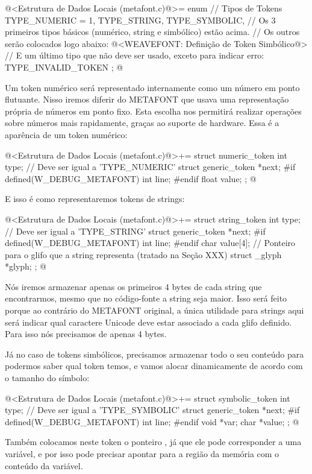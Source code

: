 \iniciocodigo
@<Estrutura de Dados Locais (metafont.c)@>=
enum { // Tipos de Tokens
  TYPE_NUMERIC = 1, TYPE_STRING, TYPE_SYMBOLIC,
  // Os 3 primeiros tipos básicos (numérico, string e simbólico) estão acima.
  // Os outros serão colocados logo abaixo:
  @<WEAVEFONT: Definição de Token Simbólico@>
  // E um último tipo que não deve ser usado, exceto para indicar erro:
  TYPE_INVALID_TOKEN
};
@
\fimcodigo

Um token numérico será representado internamente como um número em
ponto flutuante. Nisso iremos diferir do METAFONT que usava uma
representação própria de números em ponto fixo. Esta escolha nos
permitirá realizar operações sobre números mais rapidamente, graças ao
suporte de hardware.  Essa é a aparência de um token numérico:

\iniciocodigo
@<Estrutura de Dados Locais (metafont.c)@>+=
struct numeric_token{
  int type;   // Deve ser igual a 'TYPE_NUMERIC'
  struct generic_token *next;
#if defined(W_DEBUG_METAFONT)
  int line;
#endif
  float value;
};
@
\fimcodigo

E isso é como representaremos tokens de strings:

\iniciocodigo
@<Estrutura de Dados Locais (metafont.c)@>+=
struct string_token{
  int type;   // Deve ser igual a 'TYPE_STRING'
  struct generic_token *next;
#if defined(W_DEBUG_METAFONT)
  int line;
#endif
  char value[4];
  // Ponteiro para o glifo que a string representa (tratado na Seção XXX)
  struct _glyph *glyph;
};
@
\fimcodigo

Nós iremos armazenar apenas os primeiros 4 bytes de cada string que
encontrarmos, mesmo que no código-fonte a string seja maior. Isso será
feito porque ao contrário do METAFONT original, a única utilidade para
strings aqui será indicar qual caractere Unicode deve estar associado
a cada glifo definido. Para isso nós precisamos de apenas 4 bytes.

Já no caso de tokens simbólicos, precisamos armazenar todo o seu
conteúdo para podermos saber qual token temos, e vamos alocar
dinamicamente de acordo com o tamanho do símbolo:

\iniciocodigo
@<Estrutura de Dados Locais (metafont.c)@>+=
struct symbolic_token{
  int type;   // Deve ser igual a 'TYPE_SYMBOLIC'
  struct generic_token *next;
#if defined(W_DEBUG_METAFONT)
  int line;
#endif
  void *var;
  char *value;
};
@
\fimcodigo

Também colocamos neste token o ponteiro , já que ele
pode corresponder a uma variável, e por isso pode precisar apontar
para a região da memória com o conteúdo da variável.

